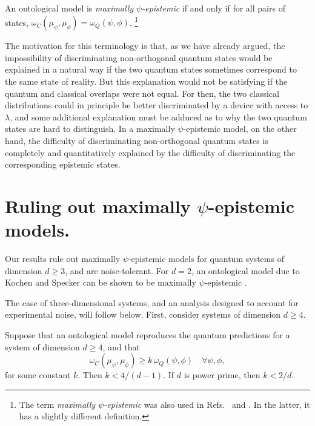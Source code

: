 \begin{dfn}
An ontological model is \emph{maximally $\psi$-epistemic} if and only if  for all pairs of states, $\omega_C(\mu_\psi,\mu_\phi) = \omega_Q(\psi,\phi)$. \footnote{The term \emph{maximally $\psi$-epistemic} was also used in Refs.~\cite{Maroney2012a} and \cite{Leifer2013}. In the latter, it has a slightly different definition.} 
\end{dfn}
The motivation for this terminology is that, as we have already argued, the impossibility of discriminating non-orthogonal quantum states would be explained in a natural way if the two quantum states sometimes correspond to the same state of reality. But this explanation would not be satisfying if the quantum and classical overlaps were not equal. For then, the two classical distributions could in principle be better discriminated by a device with access to $\lambda$, and some additional explanation must be adduced as to why the two quantum states are hard to distinguish. In a maximally $\psi$-epistemic model, on the other hand, the difficulty of discriminating non-orthogonal quantum states is completely and quantitatively explained by the difficulty of discriminating the corresponding epistemic states.

\section*{Ruling out maximally $\psi$-epistemic models.} Our results rule out maximally $\psi$-epistemic models for quantum systems of dimension $d \geq 3$, and are noise-tolerant. For $d=2$, an ontological model due to Kochen and Specker \cite{Kochen1967} can be shown to be maximally $\psi$-epistemic \cite{peterlewisprivcomm}. 

The case of three-dimensional systems, and an analysis designed to account for experimental noise, will follow below. First, consider systems of dimension $d\geq 4$. 
\begin{thm}\label{maintheorem}
Suppose that an ontological model reproduces the quantum predictions for a system of dimension $d\geq 4$, and that 
\[
\omega_C(\mu_\psi,\mu_\phi) \geq k \,\omega_Q(\psi,\phi) \quad \forall \psi,\phi ,
\]
for some constant $k$. Then $k < 4 / (d-1)$. If $d$ is power prime, then $k < 2/d$.
\end{thm}

